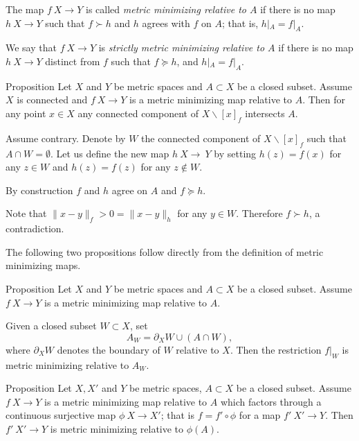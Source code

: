\documentclass[a4paper,10pt]{amsart}
\begin{document}
The map $f\:X\to Y$ is called \emph{metric minimizing relative to $A$}
if there is no map $h\:X\to Y$ such that $f\succ h$
and $h$ agrees with $f$ on $A$;
that is, $h|_A=f|_A$.

We say that $f\:X\to Y$ is \emph{strictly metric minimizing relative to $A$}
if there is no map $h\:X\to Y$ distinct from $f$
such that $f\succcurlyeq h$, 
and $h|_A=f|_A$.

\begin{thm}{Proposition}\label{prop:point-complement}
Let $X$ and $Y$ be metric spaces 
and $A\subset X$ be a closed subset.
Assume $X$ is connected and $f\:X\to Y$ is a metric minimizing map relative to $A$.
Then for any point $x\in X$ any connected component of $X\backslash [x]_f$ intersects $A$.

\end{thm}

Assume contrary.
Denote by $W$ the connected component of $X\backslash [x]_f$ such that $A\cap W=\emptyset$.
Let us define the new map $h\:X\to\ Y$ 
by setting $h(z)=f(x)$ for any $z\in W$
and $h(z)=f(z)$ for any $z\notin W$.

By construction $f$ and $h$ agree on $A$ and $f\succcurlyeq h$.

Note that $\|x-y\|_f>0=\|x-y\|_h$ for any $y\in W$.
Therefore $f\succ h$, a contradiction.
\qeds

The following two propositions follow directly from the definition of metric minimizing maps.

\begin{thm}{Proposition}\label{prop:subset}
Let $X$ and $Y$ be metric spaces and $A\subset X$ be a closed subset.
Assume $f\:X\to Y$ is a metric minimizing map relative to $A$.

Given a closed subset $W\subset X$, set 
\[A_W=\partial_X W\cup (A\cap W),\]
where $\partial_X W$ denotes the boundary of $W$ relative to $X$.
Then the restriction $f|_W$ is metric minimizing relative to $A_W$.
\end{thm}

\begin{thm}{Proposition}\label{prop:factor}
Let $X, X'$ and $Y$ be metric spaces, 
$A\subset X$ be a closed subset.
Assume $f\:X\to Y$ is a metric minimizing map relative to $A$
which factors through a continuous surjective map $\phi\:X\to X'$;
that is $f=f'\circ\phi$ for a map $f'\:X'\to Y$.
Then $f'\:X'\to Y$ is metric minimizing relative to $\phi(A)$.
\end{thm}
\end{document}
